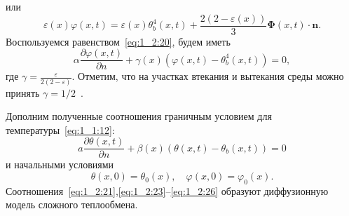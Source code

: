 или
\[
    \varepsilon(x) \varphi(x, t)=\varepsilon(x) \theta_{b}^{4}(x, t)+
    \frac{2(2-\varepsilon(x))}{3} \boldsymbol{\Phi}(x, t) \cdot \mathbf{n}.
\]
Воспользуемся равенством~\eqref{eq:1_2:20}, будем иметь
\begin{equation}
    \label{eq:1_2:24}
    \alpha \frac{\partial \varphi(x, t)}{\partial n}+
    \gamma(x)\left(\varphi(x, t)-\theta_{b}^{4}(x, t)\right)=0,
\end{equation}
где $\gamma=\frac{\varepsilon}{2(2-\varepsilon)}$.
Отметим, что на участках втекания и вытекания среды
можно принять $\gamma=1/2$~\cite{JVM-14}.


Дополним полученные соотношения граничным условием для температуры~\eqref{eq:1_1:12}:
\begin{equation}
    \label{eq:1_2:25}
    a \frac{\partial \theta(x, t)}{\partial n}
    +\beta(x)\left(\theta(x, t)-\theta_{b}(x, t)\right)=0
\end{equation}
и начальными условиями
\begin{equation}
    \label{eq:1_2:26}
    \theta(x, 0)=\theta_{0}(x), \quad \varphi(x, 0)=\varphi_{0}(x).
\end{equation}
Соотношения~\eqref{eq:1_2:21},\eqref{eq:1_2:23}--\eqref{eq:1_2:26}
образуют диффузионную модель сложного теплообмена.

\FloatBarrier
